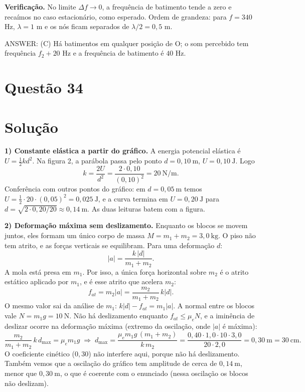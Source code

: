 \documentclass{article}%
\begin{document}
\textbf{Verificação.} No limite $\Delta f\to 0$, a frequência de batimento tende a zero e recaímos no caso estacionário, como esperado. Ordem de grandeza: para $f=340$ Hz, $\lambda=1$ m e os nós ficam separados de $\lambda/2=0{,}5$ m.

ANSWER: (C) Há batimentos em qualquer posição de O; o som percebido tem frequência $f_2+20$ Hz e a frequência de batimento é $40$ Hz.%
\newpage%
\section*{Questão 34}

\section*{Solução}

\textbf{1) Constante elástica a partir do gráfico.} A energia potencial elástica é $U=\tfrac12 k d^2$. Na figura 2, a parábola passa pelo ponto $d=0{,}10\ \text{m}$, $U=0{,}10\ \text{J}$. Logo
\[
k=\frac{2U}{d^2}=\frac{2\cdot 0{,}10}{(0{,}10)^2}=20\ \text{N/m}.
\]
Conferência com outros pontos do gráfico: em $d=0{,}05\ \text{m}$ temos $U=\tfrac12\cdot 20\cdot(0{,}05)^2=0{,}025\ \text{J}$, e a curva termina em $U=0{,}20\ \text{J}$ para $d=\sqrt{2\cdot 0{,}20/20}\approx 0{,}14\ \text{m}$. As duas leituras batem com a figura.

\textbf{2) Deformação máxima sem deslizamento.} Enquanto os blocos se movem juntos, eles formam um único corpo de massa $M=m_1+m_2=3{,}0\ \text{kg}$. O piso não tem atrito, e as forças verticais se equilibram. Para uma deformação $d$:
\[
|a|=\frac{k\,|d|}{m_1+m_2}.
\]
A mola está presa em $m_1$. Por isso, a única força horizontal sobre $m_2$ é o atrito estático aplicado por $m_1$, e é esse atrito que acelera $m_2$:
\[
f_{at}=m_2|a|=\frac{m_2}{m_1+m_2}\,k|d|.
\]
O mesmo valor sai da análise de $m_1$: $k|d|-f_{at}=m_1|a|$. A normal entre os blocos vale $N=m_1g=10\ \text{N}$. Não há deslizamento enquanto $f_{at}\le \mu_e N$, e a iminência de deslizar ocorre na deformação máxima (extremo da oscilação, onde $|a|$ é máxima):
\[
\frac{m_2}{m_1+m_2}\,k\,d_{\max}=\mu_e m_1 g
\;\Rightarrow\;
d_{\max}=\frac{\mu_e m_1 g\,(m_1+m_2)}{k\,m_2}=\frac{0{,}40\cdot 1{,}0\cdot 10\cdot 3{,}0}{20\cdot 2{,}0}=0{,}30\ \text{m}=30\ \text{cm}.
\]
O coeficiente cinético ($0{,}30$) não interfere aqui, porque não há deslizamento. Também vemos que a oscilação do gráfico tem amplitude de cerca de $0{,}14\ \text{m}$, menor que $0{,}30\ \text{m}$, o que é coerente com o enunciado (nessa oscilação os blocos não deslizam).
\end{document}
